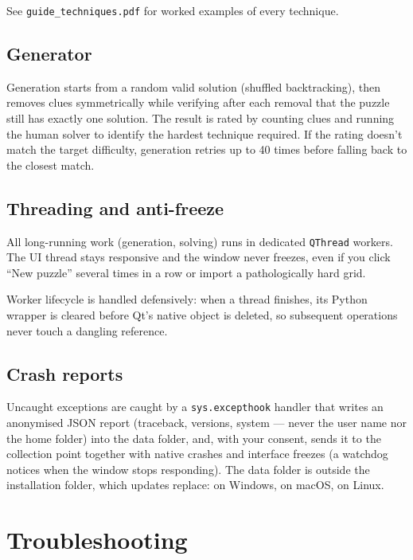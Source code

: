 See \texttt{guide\_techniques.pdf} for worked examples of every
technique.

\subsection{Generator}

Generation starts from a random valid solution (shuffled backtracking),
then removes clues symmetrically while verifying after each removal that
the puzzle still has exactly one solution. The result is rated by
counting clues and running the human solver to identify the hardest
technique required. If the rating doesn't match the target difficulty,
generation retries up to 40 times before falling back to the closest
match.

\subsection{Threading and anti-freeze}

All long-running work (generation, solving) runs in dedicated
\texttt{QThread} workers. The UI thread stays responsive and the window
never freezes, even if you click ``New puzzle'' several times in a row
or import a pathologically hard grid.

Worker lifecycle is handled defensively: when a thread finishes, its
Python wrapper is cleared before Qt's native object is deleted, so
subsequent operations never touch a dangling reference.

\subsection{Crash reports}

Uncaught exceptions are caught by a \texttt{sys.excepthook} handler that
writes an anonymised JSON report (traceback, versions, system --- never the
user name nor the home folder) into the data folder, and, with your consent,
sends it to the collection point together with native crashes and interface
freezes (a watchdog notices when the window stops responding). The data
folder is outside the installation folder, which updates replace:
 on Windows,
 on macOS,
 on Linux.

\section{Troubleshooting}

